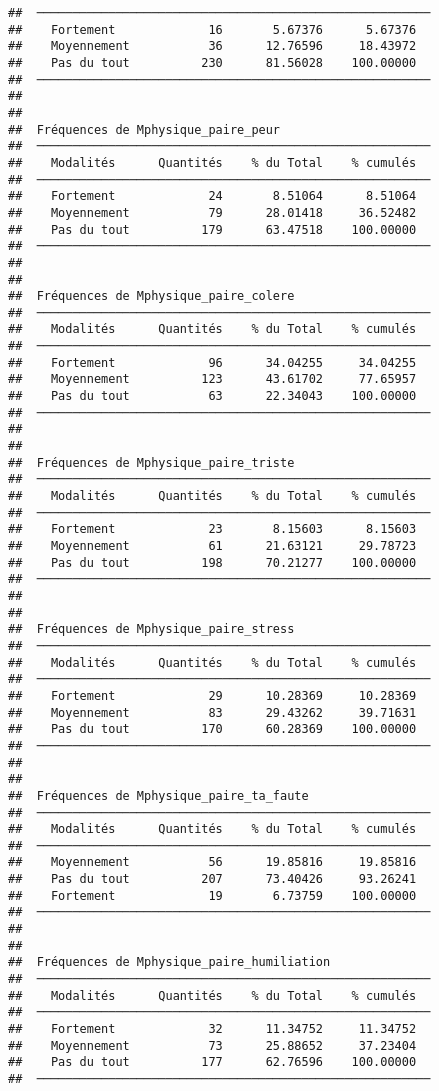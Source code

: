\documentclass[
]{article}
\begin{document}
\begin{verbatim}
##  ─────────────────────────────────────────────────────── 
##    Fortement             16       5.67376      5.67376   
##    Moyennement           36      12.76596     18.43972   
##    Pas du tout          230      81.56028    100.00000   
##  ─────────────────────────────────────────────────────── 
## 
## 
##  Fréquences de Mphysique_paire_peur                      
##  ─────────────────────────────────────────────────────── 
##    Modalités      Quantités    % du Total    % cumulés   
##  ─────────────────────────────────────────────────────── 
##    Fortement             24       8.51064      8.51064   
##    Moyennement           79      28.01418     36.52482   
##    Pas du tout          179      63.47518    100.00000   
##  ─────────────────────────────────────────────────────── 
## 
## 
##  Fréquences de Mphysique_paire_colere                    
##  ─────────────────────────────────────────────────────── 
##    Modalités      Quantités    % du Total    % cumulés   
##  ─────────────────────────────────────────────────────── 
##    Fortement             96      34.04255     34.04255   
##    Moyennement          123      43.61702     77.65957   
##    Pas du tout           63      22.34043    100.00000   
##  ─────────────────────────────────────────────────────── 
## 
## 
##  Fréquences de Mphysique_paire_triste                    
##  ─────────────────────────────────────────────────────── 
##    Modalités      Quantités    % du Total    % cumulés   
##  ─────────────────────────────────────────────────────── 
##    Fortement             23       8.15603      8.15603   
##    Moyennement           61      21.63121     29.78723   
##    Pas du tout          198      70.21277    100.00000   
##  ─────────────────────────────────────────────────────── 
## 
## 
##  Fréquences de Mphysique_paire_stress                    
##  ─────────────────────────────────────────────────────── 
##    Modalités      Quantités    % du Total    % cumulés   
##  ─────────────────────────────────────────────────────── 
##    Fortement             29      10.28369     10.28369   
##    Moyennement           83      29.43262     39.71631   
##    Pas du tout          170      60.28369    100.00000   
##  ─────────────────────────────────────────────────────── 
## 
## 
##  Fréquences de Mphysique_paire_ta_faute                  
##  ─────────────────────────────────────────────────────── 
##    Modalités      Quantités    % du Total    % cumulés   
##  ─────────────────────────────────────────────────────── 
##    Moyennement           56      19.85816     19.85816   
##    Pas du tout          207      73.40426     93.26241   
##    Fortement             19       6.73759    100.00000   
##  ─────────────────────────────────────────────────────── 
## 
## 
##  Fréquences de Mphysique_paire_humiliation               
##  ─────────────────────────────────────────────────────── 
##    Modalités      Quantités    % du Total    % cumulés   
##  ─────────────────────────────────────────────────────── 
##    Fortement             32      11.34752     11.34752   
##    Moyennement           73      25.88652     37.23404   
##    Pas du tout          177      62.76596    100.00000   
##  ───────────────────────────────────────────────────────
\end{verbatim}
\end{document}
